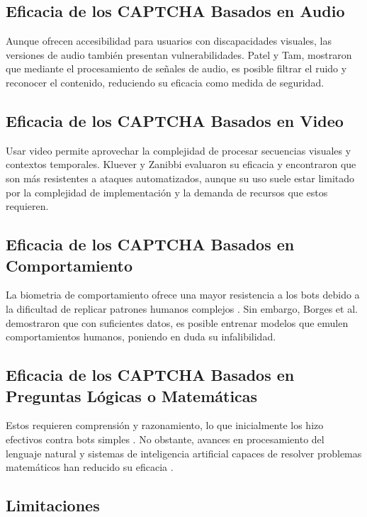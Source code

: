 \documentclass[conference]{IEEEtran}
\begin{document}
\subsection{Eficacia de los CAPTCHA Basados en Audio}

Aunque ofrecen accesibilidad para usuarios con discapacidades visuales, las versiones de audio también presentan vulnerabilidades. Patel y Tam, \cite{Patel2016, Tam2008} mostraron que mediante el procesamiento de señales de audio, es posible filtrar el ruido y reconocer el contenido, reduciendo su eficacia como medida de seguridad.

\subsection{Eficacia de los CAPTCHA Basados en Video}

Usar video permite aprovechar la complejidad de procesar secuencias visuales y contextos temporales. Kluever y Zanibbi \cite{Kluever2009} evaluaron su eficacia y encontraron que son más resistentes a ataques automatizados, aunque su uso suele estar limitado por la complejidad de implementación y la demanda de recursos que estos requieren.

\subsection{Eficacia de los CAPTCHA Basados en Comportamiento}

La biometria de comportamiento ofrece una mayor resistencia a los bots debido a la dificultad de replicar patrones humanos complejos \cite{Murdoch2020}. Sin embargo, Borges et al. \cite{Borges2018} demostraron que con suficientes datos, es posible entrenar modelos que emulen comportamientos humanos, poniendo en duda su infalibilidad.

\subsection{Eficacia de los CAPTCHA Basados en Preguntas Lógicas o Matemáticas}

Estos requieren comprensión y razonamiento, lo que inicialmente los hizo efectivos contra bots simples \cite{HernandezCastro2010}. No obstante, avances en procesamiento del lenguaje natural y sistemas de inteligencia artificial capaces de resolver problemas matemáticos han reducido su eficacia \cite{Levesque2011}.

\subsection{Limitaciones}
\end{document}
